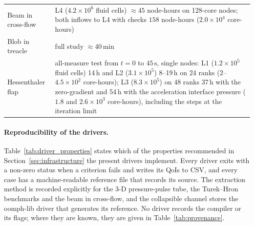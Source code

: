 \begin{table}[htbp]
\begin{tabular}{p{3.0cm}p{10.8cm}}
		Beam in cross-flow & L4 ($4.2\times10^{6}$ fluid cells) $\approx45$ node-hours on 128-core nodes; both inflows to L4 with checks $158$ node-hours ($2.0\times10^{4}$ core-hours) \\
		Blob in treacle & full study $\approx40$\,min \\
		Hessenthaler flap & all-measure test from $t = 0$ to $45\,\mathrm{s}$, single nodes: L1 ($1.2\times10^{5}$ fluid cells) 14\,h and L2 ($3.1\times10^{5}$) 8--19\,h on 24 ranks ($2$--$4.5\times10^{2}$ core-hours); L3 ($8.3\times10^{5}$) on 48 ranks 37\,h with the zero-gradient and 54\,h with the acceleration interface pressure ($1.8$ and $2.6\times10^{3}$ core-hours), including the steps at the iteration limit \\
		\bottomrule
	\end{tabular}
\end{table}

\paragraph{Reproducibility of the drivers.}
Table~\ref{tab:driver_properties} states which of the properties recommended in Section~\ref{sec:infrastructure} the present drivers implement.
Every driver exits with a non-zero status when a criterion fails and writes its QoIs to CSV, and every case has a machine-readable reference file that records its source.
The extraction method is recorded explicitly for the 3-D pressure-pulse tube, the Turek--Hron benchmarks and the beam in cross-flow, and the collapsible channel stores the oomph-lib driver that generates its reference.
No driver records the compiler or its flags; where they are known, they are given in Table~\ref{tab:provenance}.

